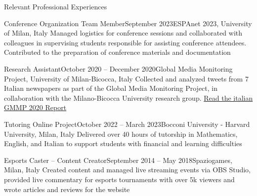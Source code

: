 \documentclass{cv} %
\begin{document}
\begin{rSection}{Relevant Professional Experiences}

    \subtitle{Academic}

    \begin{rExperienceSection}{Conference Organization Team Member}{September 2023}{ESPAnet 2023, University of Milan, Italy}
    Managed logistics for conference sessions and collaborated with colleagues in supervising students responsible for assisting conference attendees. Contributed to the preparation of conference materials and documentation
    \end{rExperienceSection}
    
    \begin{rExperienceSection}{Research Assistant}{October 2020 -- December 2020}{Global Media Monitoring Project, University of Milan-Bicocca, Italy}
    Collected and analyzed tweets from 7 Italian newspapers as part of the Global Media Monitoring Project, in collaboration with the Milano-Bicocca University research group. \href{https://www.osservatorio.it/wp-content/uploads/2016/03/GMMP-2020-Nationa-Report-Italy.pdf}{Read the italian GMMP 2020 Report}
    \end{rExperienceSection}
    
    \begin{rExperienceSection}{Tutoring Online Project}{October 2022 -- March 2023}{Bocconi University - Harvard University, Milan, Italy}
    Delivered over 40 hours of tutorship in Mathematics, English, and Italian to support students with financial and learning difficulties
    \end{rExperienceSection}
    
    \subtitle{Extra-Academic}
    
    \begin{rExperienceSection}{Esports Caster -- Content Creator}{September 2014 -- May 2018}{Spaziogames, Milan, Italy}
    Created content and managed live streaming events via OBS Studio, provided live commentary for esports tournaments with over 5k viewers and wrote articles and reviews for the website
    \end{rExperienceSection}

\end{rSection}

\end{document}
